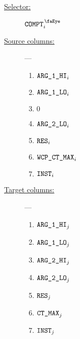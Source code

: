 \begin{description}
	\item[\underline{Selector:}] $\isRlpUtilsCompt _{i}$
	\item[\underline{Source columns:}] ---
		\begin{multicols}{4}
			\begin{enumerate}
				\item $\texttt{ARG}\texttt{\_1}\texttt{\_HI} _{i}$
				\item $\texttt{ARG}\texttt{\_1}\texttt{\_LO} _{i}$
				\item $0$
				\item $\texttt{ARG}\texttt{\_2}\texttt{\_LO} _{i}$
				\item $\texttt{RES}      _{i}$
				\item $\texttt{WCP\_CT\_MAX} _{i}$
				\item $\texttt{INST}     _{i}$
			\end{enumerate}
		\end{multicols}
	\item[\underline{Target columns:}] ---
		\begin{multicols}{4}
		\begin{enumerate}
			\item $\texttt{ARG}\texttt{\_1}\texttt{\_HI} _{j}$
			\item $\texttt{ARG}\texttt{\_1}\texttt{\_LO} _{j}$
			\item $\texttt{ARG}\texttt{\_2}\texttt{\_HI} _{j}$
			\item $\texttt{ARG}\texttt{\_2}\texttt{\_LO} _{j}$
			\item $\texttt{RES}      _{j}$
			\item $\texttt{CT\_MAX}    _{j}$
			\item $\texttt{INST}     _{j}$
		\end{enumerate}
		\end{multicols}
\end{description}
